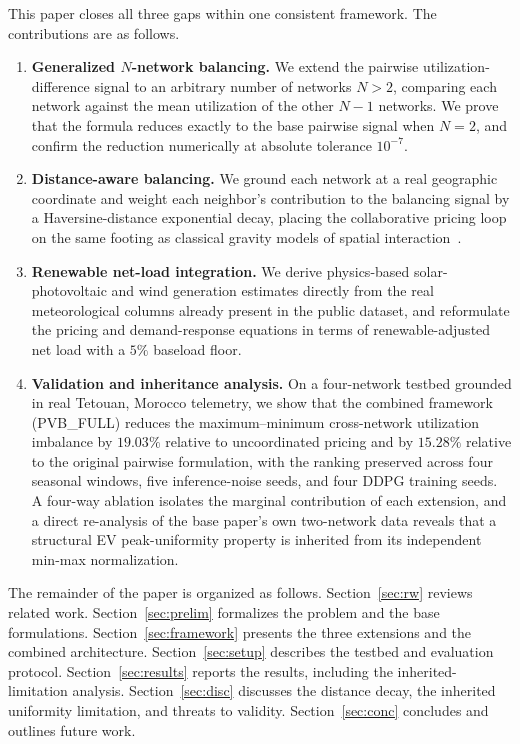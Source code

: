 \documentclass[10pt,journal]{IEEEtran}
\begin{document}
This paper closes all three gaps within one consistent framework. The
contributions are as follows.
\begin{enumerate}
  \item \textbf{Generalized $N$-network balancing.} We extend the pairwise
        utilization-difference signal to an arbitrary number of networks
        $N>2$, comparing each network against the mean utilization of the
        other $N-1$ networks. We prove that the formula reduces exactly to
        the base pairwise signal when $N=2$, and confirm the reduction
        numerically at absolute tolerance $10^{-7}$.
  \item \textbf{Distance-aware balancing.} We ground each network at a real
        geographic coordinate and weight each neighbor's contribution to the
        balancing signal by a Haversine-distance exponential decay, placing
        the collaborative pricing loop on the same footing as classical
        gravity models of spatial interaction~\cite{huff1964}.
  \item \textbf{Renewable net-load integration.} We derive physics-based
        solar-photovoltaic and wind generation estimates directly from the
        real meteorological columns already present in the public dataset,
        and reformulate the pricing and demand-response equations in terms
        of renewable-adjusted net load with a $5\%$ baseload floor.
  \item \textbf{Validation and inheritance analysis.} On a four-network
        testbed grounded in real Tetouan, Morocco telemetry, we show that
        the combined framework (PVB\_FULL) reduces the maximum--minimum
        cross-network utilization imbalance by $19.03\%$ relative to
        uncoordinated pricing and by $15.28\%$ relative to the original
        pairwise formulation, with the ranking preserved across four
        seasonal windows, five inference-noise seeds, and four DDPG
        training seeds. A four-way ablation isolates the marginal
        contribution of each extension, and a direct re-analysis of the
        base paper's own two-network data reveals that a structural
        EV peak-uniformity property is inherited from its independent
        min-max normalization.
\end{enumerate}

The remainder of the paper is organized as follows.
Section~\ref{sec:rw} reviews related work. Section~\ref{sec:prelim}
formalizes the problem and the base formulations. Section~\ref{sec:framework}
presents the three extensions and the combined architecture.
Section~\ref{sec:setup} describes the testbed and evaluation protocol.
Section~\ref{sec:results} reports the results, including the
inherited-limitation analysis. Section~\ref{sec:disc} discusses the distance
decay, the inherited uniformity limitation, and threats to validity.
Section~\ref{sec:conc} concludes and outlines future work.
\end{document}

